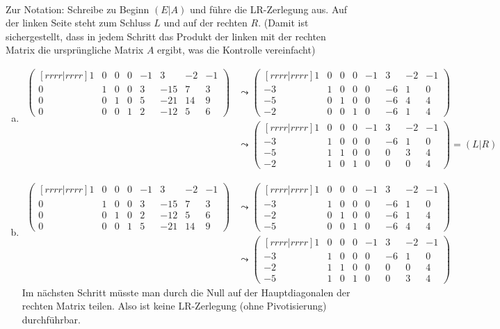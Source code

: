 \documentclass{mywork}
\begin{document}
\begin{aufgabe}\\
	Zur Notation: Schreibe zu Beginn $(E|A)$ und führe die LR-Zerlegung aus.
	Auf der linken Seite steht zum Schluss $L$ und auf der rechten $R$.
	(Damit ist sichergestellt, dass in jedem Schritt das Produkt der linken mit der rechten Matrix die ursprüngliche Matrix $A$ ergibt, was die Kontrolle vereinfacht)
	\begin{enumerate}[a)]
		\item
			\begin{align*}
				\begin{pmatrix}[rrrr|rrrr]
					1&0&0&0  &-1&3&-2&-1\\
					0&1&0&0  &3&-15&7&3\\
					0&0&1&0  &5&-21&14&9\\
					0&0&0&1  &2&-12&5&6
	 \end{pmatrix}&\leadsto
				\begin{pmatrix}[rrrr|rrrr]
					1&0&0&0  &-1&3&-2&-1\\
				-3&1&0&0  &0&-6&1&0\\
				-5&0&1&0  &0&-6&4&4\\
				-2&0&0&1  &0&-6&1&4
				\end{pmatrix}\\
				&\leadsto
				\begin{pmatrix}[rrrr|rrrr]
					1&0&0&0  &-1&3&-2&-1\\
				-3&1&0&0  &0&-6&1&0\\
				-5&1&1&0  &0&0&3&4\\
				-2&1&0&1  &0&0&0&4
				\end{pmatrix}=(L|R)
			\end{align*}
		\item
			\begin{align*}
				\begin{pmatrix}[rrrr|rrrr]
					1&0&0&0  &-1&3&-2&-1\\
					0&1&0&0  &3&-15&7&3\\
					0&0&1&0  &2&-12&5&6\\
					0&0&0&1  &5&-21&14&9
	 \end{pmatrix}&\leadsto
				\begin{pmatrix}[rrrr|rrrr]
					1&0&0&0  &-1&3&-2&-1\\
				-3&1&0&0  &0&-6&1&0\\
				-2&0&1&0  &0&-6&1&4\\
				-5&0&0&1  &0&-6&4&4
				\end{pmatrix}\\
				&\leadsto
				\begin{pmatrix}[rrrr|rrrr]
					1&0&0&0  &-1&3&-2&-1\\
				-3&1&0&0  &0&-6&1&0\\
				-2&1&1&0  &0&0&0&4\\
				-5&1&0&1  &0&0&3&4
				\end{pmatrix}
			\end{align*}
			Im nächsten Schritt müsste man durch die Null auf der Hauptdiagonalen der rechten Matrix teilen.
			Also ist keine LR-Zerlegung (ohne Pivotisierung) durchführbar.
	\end{enumerate}
\end{aufgabe}
\end{document}
